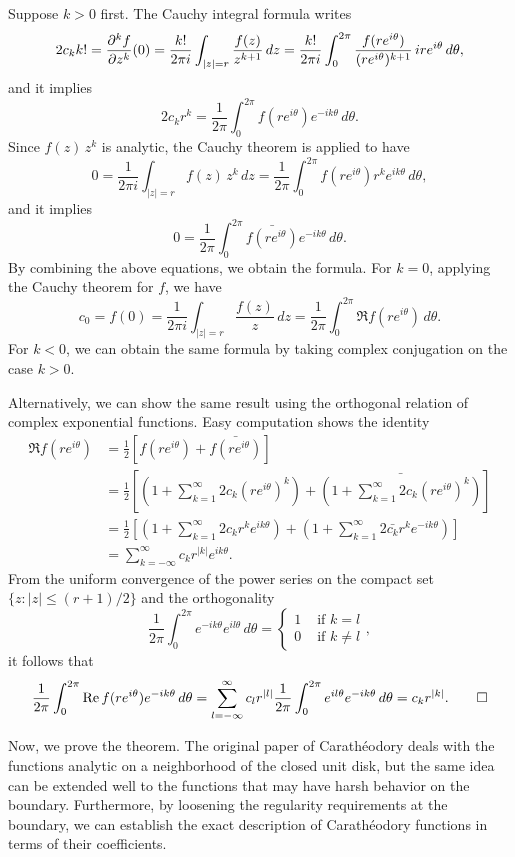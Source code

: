 \documentclass{../../small}
\begin{document}
\begin{pf}
Suppose $k>0$ first.
The Cauchy integral formula writes
\begin{align*}
2c_kk!=\pd[k]{f}{z}(0)=\frac{k!}{2\pi i}\int_{|z|=r}\frac{f(z)}{z^{k+1}}\,dz=\frac{k!}{2\pi i}\int_0^{2\pi}\frac{f(re^{i\theta})}{(re^{i\theta})^{k+1}}\,ire^{i\theta}\,d\theta,
\end{align*}
and it implies
\[2c_kr^k=\frac1{2\pi}\int_0^{2\pi}f(re^{i\theta})e^{-ik\theta}\,d\theta.\]
Since $f(z)\,z^k$ is analytic, the Cauchy theorem is applied to have
\[0=\frac1{2\pi i}\int_{|z|=r}f(z)\,z^k\,dz=\frac1{2\pi}\int_0^{2\pi}f(re^{i\theta})r^ke^{ik\theta}\,d\theta,\]
and it implies
\[0=\frac1{2\pi}\int_0^{2\pi}\bar{f(re^{i\theta})}e^{-ik\theta}\,d\theta.\]
By combining the above equations, we obtain the formula.
For $k=0$, applying the Cauchy theorem for $f$, we have
\[c_0=f(0)=\frac1{2\pi i}\int_{|z|=r}\frac{f(z)}z\,dz=\frac1{2\pi}\int_0^{2\pi}\Re f(re^{i\theta})\,d\theta.\]
For $k<0$, we can obtain the same formula by taking complex conjugation on the case $k>0$.

Alternatively, we can show the same result using the orthogonal relation of complex exponential functions.
Easy computation shows the identity
\begin{align*}
\Re f(re^{i\theta})
&=\frac12[f(re^{i\theta})+\bar{f(re^{i\theta})}]\\
&=\frac12\left[\left(1+\sum_{k=1}^\infty2c_k(re^{i\theta})^k\right)+\bar{\left(1+\sum_{k=1}^\infty2c_k(re^{i\theta})^k\right)}\right]\\
&=\frac12\left[\left(1+\sum_{k=1}^\infty2c_kr^ke^{ik\theta}\right)+\left(1+\sum_{k=1}^\infty2\bar{c_k}r^ke^{-ik\theta}\right)\right]\\
&=\sum_{k=-\infty}^\infty c_kr^{|k|}e^{ik\theta}.
\end{align*}
From the uniform convergence of the power series on the compact set $\{z:|z|\le(r+1)/2\}$ and the orthogonality
\[\frac1{2\pi}\int_0^{2\pi}e^{-ik\theta}e^{il\theta}\,d\theta=\begin{cases}1&\text{ if }k=l\\0&\text{ if }k\ne l\end{cases},\]
it follows that
\[\frac1{2\pi}\int_0^{2\pi}\Re f(re^{i\theta})e^{-ik\theta}\,d\theta=\sum_{l=-\infty}^{\infty}c_lr^{|l|}\frac1{2\pi}\int_0^{2\pi}e^{il\theta}e^{-ik\theta}\,d\theta=c_kr^{|k|}.\qedhere\]
\end{pf}

Now, we prove the theorem.
The original paper of Carath\'eodory deals with the functions analytic on a neighborhood of the closed unit disk, but the same idea can be extended well to the functions that may have harsh behavior on the boundary.
Furthermore, by loosening the regularity requirements at the boundary, we can establish the exact description of Carath\'eodory functions in terms of their coefficients.
\end{document}
